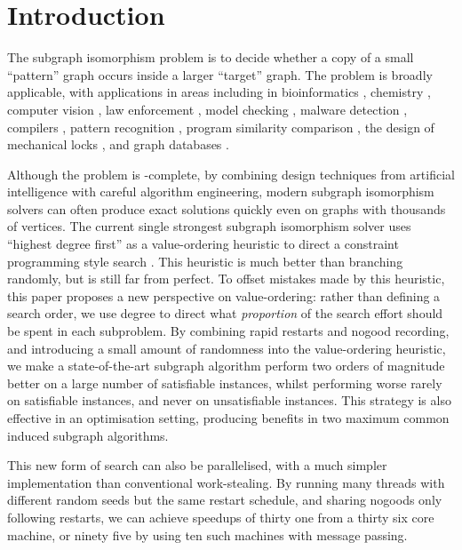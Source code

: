 \documentclass[runningheads]{llncs}
\begin{document}
\section{Introduction}

The subgraph isomorphism problem is to decide whether a copy of a small ``pattern'' graph occurs
inside a larger ``target'' graph. The problem is broadly applicable, with applications in areas
including in bioinformatics \cite{DBLP:journals/bmcbi/BonniciGPSF13}, chemistry \cite{o:Regin95}, computer vision
\cite{DBLP:journals/cviu/DamiandSHJS11,DBLP:journals/pr/SolnonDHJ15}, law enforcement
\cite{DBLP:journals/cacm/CoffmanGM04}, model checking \cite{DBLP:journals/tcs/SevegnaniC15},
malware detection \cite{DBLP:conf/dimva/BruschiMM06}, compilers
\cite{DBLP:conf/cgo/MurrayF12,DBLP:conf/cp/BlindellLCS15}, pattern recognition
\cite{DBLP:journals/ijprai/FoggiaPV14}, program similarity
comparison \cite{o:DallaPredaV17}, the design of mechanical locks
\cite{DBLP:journals/siamrev/VomelLBF17}, and graph databases
\cite{DBLP:journals/jair/McCreeshPST18}.

Although the problem is \NP-complete, by combining design techniques from artificial intelligence
with careful algorithm engineering, modern subgraph isomorphism solvers can often produce exact
solutions quickly even on graphs with thousands of vertices. The current single strongest subgraph
isomorphism solver uses ``highest degree first'' as a value-ordering heuristic to direct a
constraint programming style search
\cite{DBLP:conf/cp/McCreeshP15,DBLP:conf/lion/KotthoffMS16,DBLP:journals/jair/McCreeshPST18}. This
heuristic is much better than branching randomly, but is still far from perfect. To offset mistakes
made by this heuristic, this paper proposes a new perspective on value-ordering: rather than
defining a search order, we use degree to direct what \emph{proportion} of the search effort should
be spent in each subproblem. By combining rapid restarts and nogood recording, and introducing a
small amount of randomness into the value-ordering heuristic, we make a state-of-the-art subgraph
algorithm perform two orders of magnitude better on a large number of satisfiable instances, whilst
performing worse rarely on satisfiable instances, and never on unsatisfiable instances.  This
strategy is also effective in an optimisation setting, producing benefits in two maximum common
induced subgraph algorithms.

This new form of search can also be parallelised, with a much simpler implementation than
conventional work-stealing. By running many threads with different random seeds but the same restart
schedule, and sharing nogoods only following restarts, we can achieve speedups of thirty one from a
thirty six core machine, or ninety five by using ten such machines with message passing.
\end{document}
